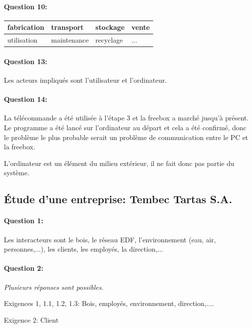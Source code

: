 \paragraph{Question 10:}

\begin{center}
 \begin{tabular}{|l|l|l|l|}
 \hline
 fabrication & transport & stockage & vente \\
 \hline
 utilisation & maintenance & recyclage & ... \\
 \hline
 \end{tabular}
\end{center}

\paragraph{Question 13:} Les acteurs impliqués sont l'utilisateur et l'ordinateur.

\paragraph{Question 14:} La télécommande a été utilisée à l'étape 3 et la freebox a marché jusqu'à présent. Le programme a été lancé sur l'ordinateur au départ et cela a été confirmé, donc le problème le plus probable serait un problème de communication entre le PC et la freebox.

L'ordinateur est un élément du milieu extérieur, il ne fait donc pas partie du système.

\subsection{Étude d'une entreprise: Tembec Tartas S.A.}

\paragraph{Question 1:} Les interacteurs sont le bois, le réseau EDF, l'environnement (eau, air, personnes,...), les clients, les employés, la direction,...

\paragraph{Question 2:} \textit{Plusieurs réponses sont possibles.}

Exigences 1, 1.1, 1.2, 1.3: Bois, employés, environnement, direction,....

Exigence 2: Client

